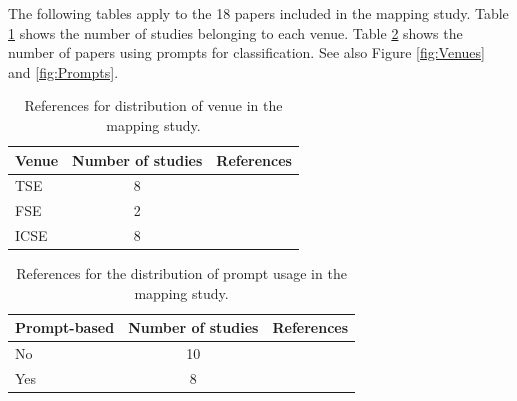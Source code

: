 \documentclass[a4paper]{article}
\begin{document}
\begin{appendices}
The following tables apply to the 18 papers included in the mapping study. Table \ref{refs:venues} shows the number of studies belonging to each venue. Table \ref{refs:prompts} shows the number of papers using prompts for classification.
See also Figure \ref{fig:Venues} and \ref{fig:Prompts}.
\begin{table}[ht]
	\caption{References for distribution of venue in the mapping study.}
	\begin{tabularx}{\textwidth}{|l|c|X|}
		\hline
		\textbf{Venue} & \textbf{Number of studies} & \textbf{References} \\ \hline
		TSE & 8 & \cite{10323231,10402095,10586831,10648982,10659742,10746847,10599336,10704582} \\ \hline
		FSE & 2 & \cite{10.1145/3663529.3663785,10.1145/3663529.3663794} \\ \hline
		ICSE & 8 & \cite{10.1145/3597503.3623345,10.1145/3597503.3623304,10.1145/3597503.3639217,10.1145/3597503.3639117,10.1145/3597503.3639194,10.1145/3597503.3639202,10.1145/3597503.3639216,10.1145/3597503.3623322} \\ \hline
	\end{tabularx}
	\label{refs:venues}
\end{table}

\begin{table}[ht]
	\caption{References for the distribution of prompt usage in the mapping study.}
	\begin{tabularx}{\textwidth}{|l|c|X|}
		\hline
		\textbf{Prompt-based} & \textbf{Number of studies} & \textbf{References} \\ \hline
		No & 10 & \cite{10.1145/3597503.3623345,10.1145/3597503.3623304,10.1145/3597503.3639217,10.1145/3597503.3639202,10323231,10402095,10586831,10.1145/3597503.3639216,10704582,10.1145/3597503.3623322} \\ \hline
		Yes & 8 & \cite{10.1145/3597503.3639117,10.1145/3597503.3639194,10.1145/3663529.3663785,10.1145/3663529.3663794,10648982,10659742,10746847,10599336} \\ \hline
	\end{tabularx}
	\label{refs:prompts}
\end{table}


\end{appendices}
\end{document}
